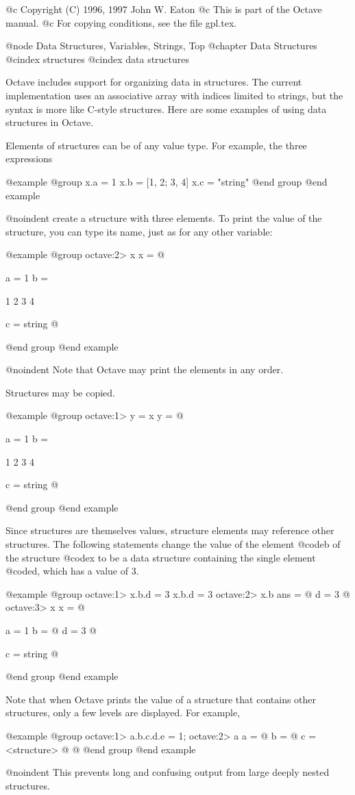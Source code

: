@c Copyright (C) 1996, 1997 John W. Eaton
@c This is part of the Octave manual.
@c For copying conditions, see the file gpl.tex.

@node Data Structures, Variables, Strings, Top
@chapter Data Structures
@cindex structures
@cindex data structures

Octave includes support for organizing data in structures.  The current
implementation uses an associative array with indices limited to
strings, but the syntax is more like C-style structures.  Here are some
examples of using data structures in Octave.

Elements of structures can be of any value type.  For example, the three
expressions

@example
@group
x.a = 1
x.b = [1, 2; 3, 4]
x.c = "string"
@end group
@end example

@noindent
create a structure with three elements.  To print the value of the
structure, you can type its name, just as for any other variable:

@example
@group
octave:2> x
x =
@{
  a = 1
  b =

    1  2
    3  4

  c = string
@}
@end group
@end example

@noindent
Note that Octave may print the elements in any order.

Structures may be copied.

@example
@group
octave:1> y = x
y =
@{
  a = 1
  b =

    1  2
    3  4

  c = string
@}
@end group
@end example

Since structures are themselves values, structure elements may reference
other structures.  The following statements change the value of the
element @code{b} of the structure @code{x} to be a data structure
containing the single element @code{d}, which has a value of 3.

@example
@group
octave:1> x.b.d = 3
x.b.d = 3
octave:2> x.b
ans =
@{
  d = 3
@}
octave:3> x
x =
@{
  a = 1
  b =
  @{
    d = 3
  @}

  c = string
@}
@end group
@end example

Note that when Octave prints the value of a structure that contains
other structures, only a few levels are displayed.  For example,

@example
@group
octave:1> a.b.c.d.e = 1;
octave:2> a
a =
@{
  b =
  @{
    c = <structure>
  @}
@}
@end group
@end example

@noindent
This prevents long and confusing output from large deeply nested
structures.

